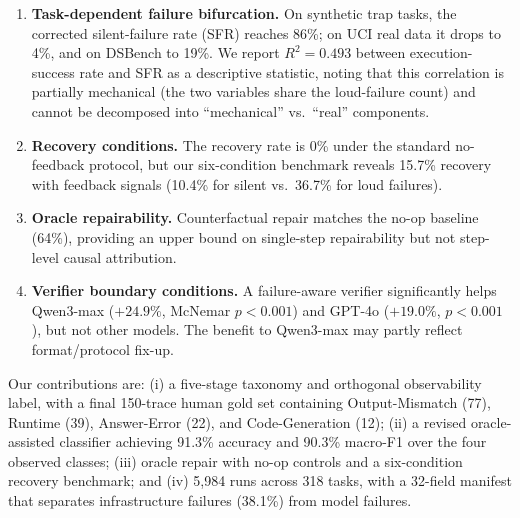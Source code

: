 \begin{enumerate}[leftmargin=*,itemsep=2pt]
\item \textbf{Task-dependent failure bifurcation.} On synthetic trap tasks, the corrected silent-failure rate (SFR) reaches 86\%; on UCI real data it drops to 4\%, and on DSBench to 19\%. We report $R^2 = 0.493$ between execution-success rate and SFR as a descriptive statistic, noting that this correlation is partially mechanical (the two variables share the loud-failure count) and cannot be decomposed into ``mechanical'' vs.\ ``real'' components.
\item \textbf{Recovery conditions.} The recovery rate is 0\% under the standard no-feedback protocol, but our six-condition benchmark reveals 15.7\% recovery with feedback signals (10.4\% for silent vs.\ 36.7\% for loud failures).
\item \textbf{Oracle repairability.} Counterfactual repair matches the no-op baseline (64\%), providing an upper bound on single-step repairability but not step-level causal attribution.
\item \textbf{Verifier boundary conditions.} A failure-aware verifier significantly helps Qwen3-max ($+24.9\%$, McNemar $p<0.001$) and GPT-4o ($+19.0\%$, $p<0.001$), but not other models. The benefit to Qwen3-max may partly reflect format/protocol fix-up.
\end{enumerate}

Our contributions are: (i) a five-stage taxonomy and orthogonal observability label, with a final 150-trace human gold set containing Output-Mismatch (77), Runtime (39), Answer-Error (22), and Code-Generation (12); (ii) a revised oracle-assisted classifier achieving 91.3\% accuracy and 90.3\% macro-F1 over the four observed classes; (iii) oracle repair with no-op controls and a six-condition recovery benchmark; and (iv) 5{,}984 runs across 318 tasks, with a 32-field manifest that separates infrastructure failures (38.1\%) from model failures.
